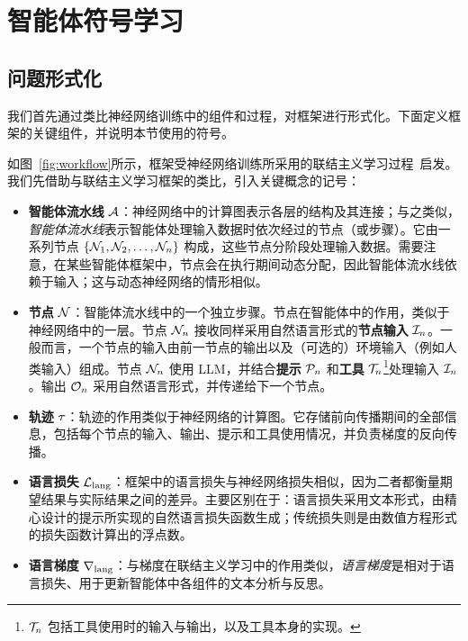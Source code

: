 \section{智能体符号学习}



\subsection{问题形式化}

我们首先通过类比神经网络训练中的组件和过程，对\baby{}框架进行形式化。下面定义框架的关键组件，并说明本节使用的符号。

如图~\ref{fig:workflow}所示，\baby{}框架受神经网络训练所采用的联结主义学习过程~\citep{hinton1990connectionist}启发。我们先借助与联结主义学习框架的类比，引入关键概念的记号：

\begin{itemize}
    \item \textbf{智能体流水线} $\mathcal{A}$：神经网络中的计算图表示各层的结构及其连接；与之类似，\textit{智能体流水线}表示智能体处理输入数据时依次经过的节点（或步骤）。它由一系列节点 $\{\mathcal{N}_1, \mathcal{N}_2, \ldots, \mathcal{N}_n\}$ 构成，这些节点分阶段处理输入数据。需要注意，在某些智能体框架中，节点会在执行期间动态分配，因此智能体流水线依赖于输入；这与动态神经网络的情形相似。

    \item \textbf{节点} $\mathcal{N}$：智能体流水线中的一个独立步骤。节点在智能体中的作用，类似于神经网络中的一层。节点 $\mathcal{N}_n$ 接收同样采用自然语言形式的\textbf{节点输入} $\mathcal{I}_n$。一般而言，一个节点的输入由前一节点的输出以及（可选的）环境输入（例如人类输入）组成。节点 $\mathcal{N}_n$ 使用 LLM，并结合\textbf{提示} $\mathcal{P}_n$ 和\textbf{工具} $\mathcal{T}_n$\footnote{$\mathcal{T}_n$ 包括工具使用时的输入与输出，以及工具本身的实现。}处理输入 $\mathcal{I}_n$。输出 $\mathcal{O}_n$ 采用自然语言形式，并传递给下一个节点。

    \item \textbf{轨迹} $\tau$：轨迹的作用类似于神经网络的计算图。它存储前向传播期间的全部信息，包括每个节点的输入、输出、提示和工具使用情况，并负责梯度的反向传播。

    \item \textbf{语言损失} $\mathcal{L}_{\text{lang}}$：\baby{}框架中的语言损失与神经网络损失相似，因为二者都衡量期望结果与实际结果之间的差异。主要区别在于：语言损失采用文本形式，由精心设计的提示所实现的自然语言损失函数生成；传统损失则是由数值方程形式的损失函数计算出的浮点数。

    \item \textbf{语言梯度} $\nabla_{\text{lang}}$：与梯度在联结主义学习中的作用类似，\textit{语言梯度}是相对于语言损失、用于更新智能体中各组件的文本分析与反思。
\end{itemize}

